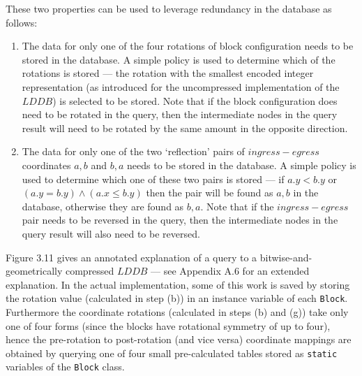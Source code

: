 \documentclass[12pt,notitlepage]{report}
\begin{document}
These two properties can be used to leverage redundancy in the database as follows:
\begin{enumerate}
\item The data for only one of the four rotations of block configuration needs to be stored in the database. A simple policy is used to determine which of the rotations is stored --- the rotation with the smallest encoded integer representation (as introduced for the uncompressed implementation of the $LDDB$) is selected to be stored. Note that if the block configuration does need to be rotated in the query, then the intermediate nodes in the query result will need to be rotated by the same amount in the opposite direction. 
\item The data for only one of the two `reflection' pairs of $ingress-egress$ coordinates $a,b$ and $b,a$ needs to be stored in the database. A simple policy is used to determine which one of these two pairs is stored --- if $a.y < b.y$ or $(a.y = b.y) \land (a.x \leq b.y)$ then the pair will be found as $a,b$ in the database, otherwise they are found as $b,a$. Note that if the $ingress-egress$ pair needs to be reversed in the query, then the intermediate nodes in the query result will also need to be reversed. 
\end{enumerate}

\noindent
Figure 3.11 gives an annotated explanation of a query to a bitwise-and-geometrically compressed $LDDB$ --- see Appendix A.6 for an extended explanation. In the actual implementation, some of this work is saved by storing the rotation value (calculated in step (b)) in an instance variable of each {\tt Block}. Furthermore the coordinate rotations (calculated in steps (b) and (g)) take only one of four forms (since the blocks have rotational symmetry of up to four), hence the pre-rotation to post-rotation (and vice versa) coordinate mappings are obtained by querying one of four small pre-calculated tables stored as {\tt static} variables of the {\tt Block} class.\\
\end{document}
